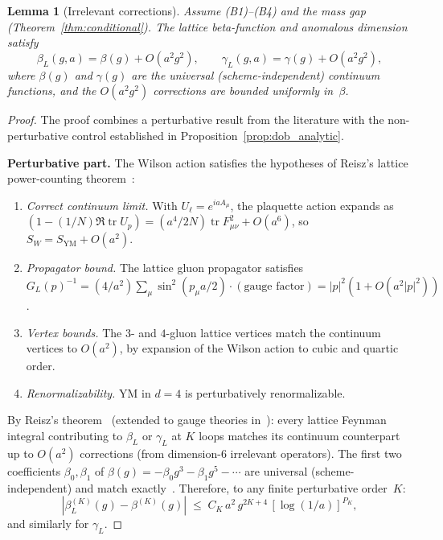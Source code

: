\documentclass[11pt,a4paper]{article}
\theoremstyle{plain}
\newtheorem{lemma}[theorem]{Lemma}
\theoremstyle{definition}
\theoremstyle{remark}
\newcommand{\tr}{\operatorname{tr}}
\begin{document}
\begin{lemma}[Irrelevant corrections]\label{lem:irrelevant}
Assume (B1)--(B4) \cite{FontesSU2} and the mass gap
\textup{(}Theorem~\ref{thm:conditional}\textup{)}.
The lattice beta-function and anomalous dimension satisfy
\begin{equation}\label{eq:irrelevant}
  \beta_L(g, a) = \beta(g) + O(a^2 g^2),
  \qquad
  \gamma_L(g, a) = \gamma(g) + O(a^2 g^2),
\end{equation}
where $\beta(g)$ and $\gamma(g)$ are the universal
\textup{(}scheme-independent\textup{)} continuum functions,
and the $O(a^2 g^2)$ corrections are bounded uniformly
in~$\beta$.
\end{lemma}

\begin{proof}
The proof combines a perturbative result from the
literature with the non-perturbative control established
in Proposition~\ref{prop:dob_analytic}.

\smallskip
\noindent\textbf{Perturbative part.}
The Wilson action satisfies the hypotheses of Reisz's
lattice power-counting theorem~\cite{Reisz1988}:
\begin{enumerate}[label=(R\arabic*),nosep]
  \item \emph{Correct continuum limit.}
    With $U_\ell = e^{iaA_\mu}$, the plaquette action
    expands as $(1{-}(1/N)\Re\tr U_p)
    = (a^4/2N)\tr F_{\mu\nu}^2 + O(a^6)$,
    so $S_W = S_{\mathrm{YM}} + O(a^2)$.
  \item \emph{Propagator bound.}
    The lattice gluon propagator satisfies
    $G_L(p)^{-1} = (4/a^2)\sum_\mu \sin^2(p_\mu a/2)
    \cdot(\text{gauge factor})
    = |p|^2(1 + O(a^2|p|^2))$.
  \item \emph{Vertex bounds.}
    The $3$- and $4$-gluon lattice vertices match the
    continuum vertices to $O(a^2)$, by expansion of the
    Wilson action to cubic and quartic order.
  \item \emph{Renormalizability.}
    YM in $d = 4$ is perturbatively renormalizable.
\end{enumerate}
By Reisz's theorem~\cite{Reisz1988}
(extended to gauge theories in~\cite{Reisz89}):
every lattice Feynman integral contributing to
$\beta_L$ or $\gamma_L$ at $K$ loops matches its
continuum counterpart up to $O(a^2)$ corrections
(from dimension-$6$ irrelevant operators).
The first two coefficients $\beta_0, \beta_1$ of
$\beta(g) = -\beta_0 g^3 - \beta_1 g^5 - \cdots$ are
universal (scheme-independent) and match
exactly~\cite{Luscher_Weisz}.
Therefore, to any finite perturbative order~$K$:
\begin{equation}\label{eq:pert_matching}
  |\beta_L^{(K)}(g) - \beta^{(K)}(g)|
  \;\leq\; C_K\,a^2\,g^{2K+4}\,[\log(1/a)]^{P_K},
\end{equation}
and similarly for $\gamma_L$.


\end{proof}
\end{document}

